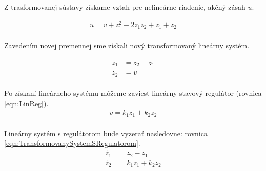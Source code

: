 \documentclass[../main.tex]{subfiles}
\begin{document}
Z trasformovanej sústavy získame vzťah pre nelineárne riadenie, akčný zásah $u$.

\begin{equation}
	\begin{gathered}
		u = v + z_1^2 - 2z_1z_2 + z_1 + z_2\\
	\end{gathered}
	\label{eqn:Noveu}
\end{equation}

Zavedením novej premennej sme získali nový transformovaný lineárny systém.

\begin{equation}
	\begin{split}
	\dot{z_1}  & = z_2 - z_1 \\
	 \dot{z_2} & = v \\
	\end{split}
	\label{eqn:TransformovanySystem}
\end{equation}

Po získaní lineárneho systému môžeme zaviesť lineárny stavový regulátor (rovnica \ref{eqn:LinReg}).
\begin{equation}
	\begin{split}
		v = k_1z_1 + k_2z_2 \\
	\end{split}
	\label{eqn:LinReg}
\end{equation}

Lineárny systém s regulátorom bude vyzerať nasledovne: rovnica \ref{eqn:TransformovanySystemSRegulatorom}. 
\begin{equation}
	\begin{split}
	\dot{z_1}  & = z_2 - z_1 \\
	 \dot{z_2} & = k_1z_1 + k_2z_2 \\
	\end{split}
	\label{eqn:TransformovanySystemSRegulatorom}
\end{equation}
\end{document}
